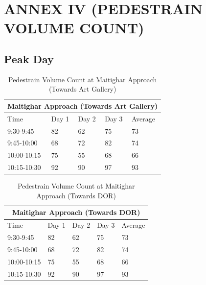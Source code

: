 \chapter{ANNEX IV (PEDESTRAIN VOLUME COUNT)}

\section{Peak Day}

\begin{table}[h!]
    \centering
    \caption{ Pedestrain Volume Count at Maitighar Approach (Towards Art Gallery)}
    \begin{tabular}{|l|l|l|l|l|}
        \hline
        \multicolumn{5}{|c|}{ \textbf{Maitighar Approach (Towards Art Gallery) } } \\
        \hline
        Time	&Day 1	&Day 2	&Day 3	&Average \\ \hline
        9:30-9:45	&82	&62	&75	&73 \\ \hline
        9:45-10:00	&68	&72	&82	&74 \\ \hline
        10:00-10:15	&75	&55	&68	&66 \\ \hline
        10:15-10:30	&92	&90	&97	&93 \\ \hline
    \end{tabular}
\end{table}

\begin{table}[h!]
    \centering
    \caption{ Pedestrain Volume Count at Maitighar Approach (Towards DOR)} 
    \begin{tabular}{|l|l|l|l|l|}
        \hline
        \multicolumn{5}{|c|}{ \textbf{Maitighar Approach (Towards DOR) } } \\
        \hline
        Time	&Day 1	&Day 2	&Day 3	&Average \\ \hline
        9:30-9:45&	82&	62&	75&	73 \\ \hline
        9:45-10:00&	68&	72&	82&	74 \\ \hline
        10:00-10:15&	75&	55&	68&	66 \\ \hline
        10:15-10:30&	92&	90&	97&	93 \\ \hline
    \end{tabular}
\end{table}

